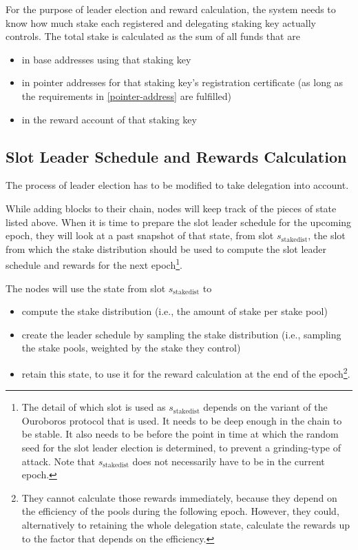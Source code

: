\documentclass[11pt,a4paper]{article}
\begin{document}
For the purpose of leader election and reward calculation, the system
needs to know how much stake each registered and delegating staking key
actually controls. The total stake is calculated as the sum of all
funds that are
\begin{itemize}
\item in base addresses using that staking key
\item in pointer addresses for that staking key's registration
  certificate (as long as the requirements in \cref{pointer-address} are
  fulfilled)
\item in the reward account of that staking key
\end{itemize}

\subsection{Slot Leader Schedule and Rewards Calculation}
\label{slot-leader-schedule}

The process of leader election has to be modified to take delegation
into account.

While adding blocks to their chain, nodes will keep track of the
pieces of state listed above. When it is time to prepare the slot
leader schedule for the upcoming epoch, they will look at a past
snapshot of that state, from slot \(s_\text{stakedist}\), the slot
from which the stake distribution should be used to compute the slot
leader schedule and rewards for the next epoch\footnote{The detail of
  which slot is used as \(s_\text{stakedist}\) depends on the variant
  of the Ouroboros protocol that is used. It needs to be deep enough
  in the chain to be stable. It also needs to be before the point in
  time at which the random seed for the slot leader election is
  determined, to prevent a grinding-type of attack. Note that
  \(s_\text{stakedist}\) does not necessarily have to be in the
  current epoch.}.

The nodes will use the state from slot \(s_\text{stakedist}\) to
\begin{itemize}
\item compute the stake distribution (i.e., the amount of stake per
  stake pool)
\item create the leader schedule by sampling the stake distribution
  (i.e., sampling the stake pools, weighted by the stake they control)
\item retain this state, to use it for the reward calculation at the
  end of the epoch\footnote{They cannot calculate those rewards
    immediately, because they depend on the efficiency of the pools
    during the following epoch. However, they could, alternatively to
    retaining the whole delegation state, calculate the rewards up to
    the factor that depends on the efficiency.}.
\end{itemize}
\end{document}
